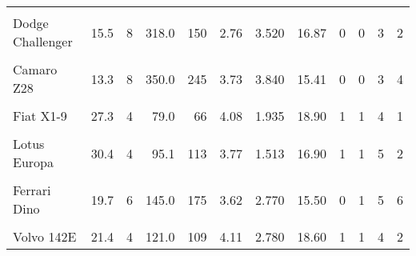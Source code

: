 \documentclass[border=1mm]{standalone}
\begin{document}
\begin{table}
{\begin{tabular}{lrrrrrrrrrrr}
\cellcolor{gray!10}{Toyota Corona} & \cellcolor{gray!10}{21.5} & \cellcolor{gray!10}{4} & \cellcolor{gray!10}{120.1} & \cellcolor{gray!10}{97} & \cellcolor{gray!10}{3.70} & \cellcolor{gray!10}{2.465} & \cellcolor{gray!10}{20.01} & \cellcolor{gray!10}{1} & \cellcolor{gray!10}{0} & \cellcolor{gray!10}{3} & \cellcolor{gray!10}{1}\\
Dodge Challenger & 15.5 & 8 & 318.0 & 150 & 2.76 & 3.520 & 16.87 & 0 & 0 & 3 & 2\\
\cellcolor{gray!10}{AMC Javelin} & \cellcolor{gray!10}{15.2} & \cellcolor{gray!10}{8} & \cellcolor{gray!10}{304.0} & \cellcolor{gray!10}{150} & \cellcolor{gray!10}{3.15} & \cellcolor{gray!10}{3.435} & \cellcolor{gray!10}{17.30} & \cellcolor{gray!10}{0} & \cellcolor{gray!10}{0} & \cellcolor{gray!10}{3} & \cellcolor{gray!10}{2}\\
Camaro Z28 & 13.3 & 8 & 350.0 & 245 & 3.73 & 3.840 & 15.41 & 0 & 0 & 3 & 4\\
\cellcolor{gray!10}{Pontiac Firebird} & \cellcolor{gray!10}{19.2} & \cellcolor{gray!10}{8} & \cellcolor{gray!10}{400.0} & \cellcolor{gray!10}{175} & \cellcolor{gray!10}{3.08} & \cellcolor{gray!10}{3.845} & \cellcolor{gray!10}{17.05} & \cellcolor{gray!10}{0} & \cellcolor{gray!10}{0} & \cellcolor{gray!10}{3} & \cellcolor{gray!10}{2}\\
\addlinespace
Fiat X1-9 & 27.3 & 4 & 79.0 & 66 & 4.08 & 1.935 & 18.90 & 1 & 1 & 4 & 1\\
\cellcolor{gray!10}{Porsche 914-2} & \cellcolor{gray!10}{26.0} & \cellcolor{gray!10}{4} & \cellcolor{gray!10}{120.3} & \cellcolor{gray!10}{91} & \cellcolor{gray!10}{4.43} & \cellcolor{gray!10}{2.140} & \cellcolor{gray!10}{16.70} & \cellcolor{gray!10}{0} & \cellcolor{gray!10}{1} & \cellcolor{gray!10}{5} & \cellcolor{gray!10}{2}\\
Lotus Europa & 30.4 & 4 & 95.1 & 113 & 3.77 & 1.513 & 16.90 & 1 & 1 & 5 & 2\\
\cellcolor{gray!10}{Ford Pantera L} & \cellcolor{gray!10}{15.8} & \cellcolor{gray!10}{8} & \cellcolor{gray!10}{351.0} & \cellcolor{gray!10}{264} & \cellcolor{gray!10}{4.22} & \cellcolor{gray!10}{3.170} & \cellcolor{gray!10}{14.50} & \cellcolor{gray!10}{0} & \cellcolor{gray!10}{1} & \cellcolor{gray!10}{5} & \cellcolor{gray!10}{4}\\
Ferrari Dino & 19.7 & 6 & 145.0 & 175 & 3.62 & 2.770 & 15.50 & 0 & 1 & 5 & 6\\
\addlinespace
\cellcolor{gray!10}{Maserati Bora} & \cellcolor{gray!10}{15.0} & \cellcolor{gray!10}{8} & \cellcolor{gray!10}{301.0} & \cellcolor{gray!10}{335} & \cellcolor{gray!10}{3.54} & \cellcolor{gray!10}{3.570} & \cellcolor{gray!10}{14.60} & \cellcolor{gray!10}{0} & \cellcolor{gray!10}{1} & \cellcolor{gray!10}{5} & \cellcolor{gray!10}{8}\\
Volvo 142E & 21.4 & 4 & 121.0 & 109 & 4.11 & 2.780 & 18.60 & 1 & 1 & 4 & 2\\
\bottomrule
\end{tabular}}
\end{table}
\end{document}
